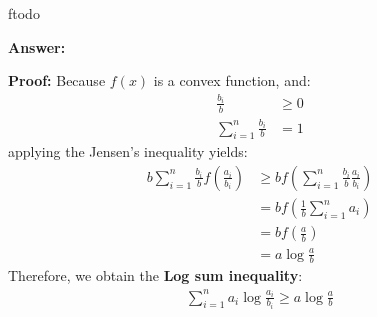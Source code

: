 ƒtodo\documentclass{article}
\newenvironment{QandA}{\begin{enumerate}[label=\arabic*.]}{\end{enumerate}}
\newenvironment{InnerQandA}{\begin{enumerate}[label=\roman*.]}{\end{enumerate}}
\newenvironment{answer}{\par\normalfont \textbf{Answer:}}{}
\newenvironment{proof}{\par\normalfont \textbf{Proof:}}{}
\begin{document}
\begin{QandA}
\begin{InnerQandA}
\begin{answer}
\begin{proof}
                Because $f(x)$ is a convex function, and:
                \begin{align*}
                    \frac{b_i}{b} &\ge 0 \\
                    \sum_{i=1}^n \frac{b_i}{b} &= 1
                \end{align*}
                applying the Jensen's inequality yields:
                \begin{align*}
                    b \sum_{i=1}^n \frac{b_i}{b} f \left( \frac{a_i}{b_i} \right) & \ge b f \left( \sum_{i=1}^n \frac{b_i}{b} \frac{a_i}{b_i} \right) \\
                    &= b f \left( \frac{1}{b} \sum_{i=1}^n a_i \right) \\
                    &= b f \left( \frac{a}{b} \right) \\
                    &= a \log \frac{a}{b}
                \end{align*}
                Therefore, we obtain the \textbf{Log sum inequality}:
                \begin{align*}
                    \sum_{i=1}^n a_i \log \frac{a_i}{b_i} \ge a \log \frac{a}{b}
                \end{align*}
            \end{proof}


\end{answer}
\end{InnerQandA}
\end{QandA}
\end{document}
